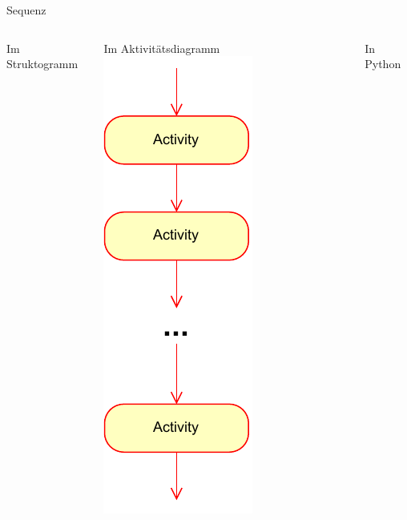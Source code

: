 \documentclass[xelatex,aspectratio=169]{beamer}
\begin{document}
\begin{frame}{Sequenz}
\begin{columns}[t]
\begin{column}{.3\linewidth}
\begin{block}{Im Struktogramm}
      \end{block}
    \end{column}
    \begin{column}{.3\linewidth}
      \begin{block}{Im Aktivitätsdiagramm}
        \centering
        \includegraphics[height=.7\textheight]{fig/algorithmus_sequenz_aktivitaetsdiagram.drawio.pdf}
      \end{block}

    \end{column}
    \begin{column}{.4\linewidth}
      \begin{block}{In Python}
        \inputminted{python}{src/algorithmus_sequenz.py}
      \end{block}

    \end{column}
  \end{columns}

\end{frame}
\end{document}
